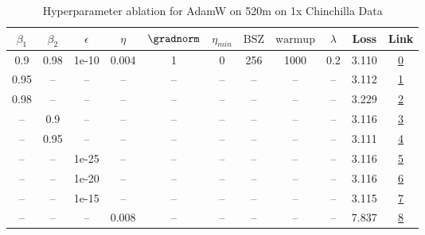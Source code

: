 \begin{table}[H]
\centering
\caption{Hyperparameter ablation for AdamW on 520m on 1x Chinchilla Data}
\label{tab:ablation_adamw_520m_on_1x_chinchilla_data}
\begin{tabular}{ccccccccccc}
\toprule
$\beta_1$ & $\beta_2$ & $\epsilon$ & $\eta$ & $\gradnorm$ & $\eta_{min}$ & $\mathrm{BSZ}$ & $\mathrm{warmup}$ & $\lambda$ & Loss & Link \\
\midrule
0.9 & 0.98 & 1e-10 & 0.004 & 1 & 0 & 256 & 1000 & 0.2 & 3.110 & \href{https://wandb.ai/stanford-mercury/optimizer-scaling/runs/sweep-520m-10B-adamwf7a9c6lr0.004-wd0.2-minlr0-warmup1000-b10.9--0a09ef}{0} \\
\midrule
0.95 & -- & -- & -- & -- & -- & -- & -- & -- & 3.112 & \href{https://wandb.ai/stanford-mercury/optimizer-scaling/runs/sweep-520m-10B-adamw92fab3lr0.004-wd0.2-minlr0-warmup1000-b10.95-b52d40}{1} \\
0.98 & -- & -- & -- & -- & -- & -- & -- & -- & 3.229 & \href{https://wandb.ai/stanford-mercury/optimizer-scaling/runs/sweep-520m-10B-adamw757dfblr0.004-wd0.2-minlr0-warmup1000-b10.98-82eb00}{2} \\
-- & 0.9 & -- & -- & -- & -- & -- & -- & -- & 3.116 & \href{https://wandb.ai/stanford-mercury/optimizer-scaling/runs/sweep-520m-10B-adamw2399bdlr0.004-wd0.2-minlr0-warmup1000-b10.9--235c9f}{3} \\
-- & 0.95 & -- & -- & -- & -- & -- & -- & -- & 3.111 & \href{https://wandb.ai/stanford-mercury/optimizer-scaling/runs/sweep-520m-10B-adamw49b619lr0.004-wd0.2-minlr0-warmup1000-b10.9--0339de}{4} \\
-- & -- & 1e-25 & -- & -- & -- & -- & -- & -- & 3.116 & \href{https://wandb.ai/stanford-mercury/optimizer-scaling/runs/sweep-520m-10B-adamwe08492lr0.004-wd0.2-minlr0-warmup1000-b10.9--550b0a}{5} \\
-- & -- & 1e-20 & -- & -- & -- & -- & -- & -- & 3.116 & \href{https://wandb.ai/stanford-mercury/optimizer-scaling/runs/sweep-520m-10B-adamw920b54lr0.004-wd0.2-minlr0-warmup1000-b10.9--29bc56}{6} \\
-- & -- & 1e-15 & -- & -- & -- & -- & -- & -- & 3.115 & \href{https://wandb.ai/stanford-mercury/optimizer-scaling/runs/sweep-520m-10B-adamwc8444flr0.004-wd0.2-minlr0-warmup1000-b10.9--ad8761}{7} \\
-- & -- & -- & 0.008 & -- & -- & -- & -- & -- & 7.837 & \href{https://wandb.ai/stanford-mercury/optimizer-scaling/runs/sweep-520m-10B-adamw6dd5c1lr0.008-wd0.2-minlr0-warmup1000-b10.9--2c3f20}{8} \\

\end{tabular}
\end{table}
